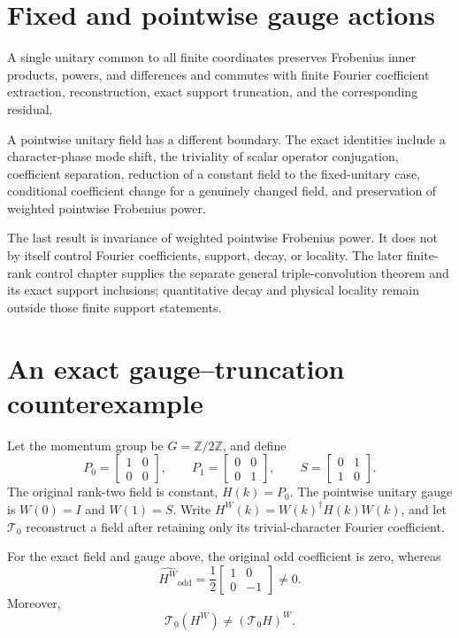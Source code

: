 \section{Fixed and pointwise gauge actions}

A single unitary common to all finite coordinates preserves Frobenius inner products,
powers, and differences and commutes with finite Fourier coefficient extraction,
reconstruction, exact support truncation, and the corresponding residual.

A pointwise unitary field has a different boundary. The exact identities include a
character-phase mode shift, the triviality of scalar operator conjugation, coefficient
separation, reduction of a constant field to the fixed-unitary case, conditional
coefficient change for a genuinely changed field, and preservation of weighted
pointwise Frobenius power.

The last result is invariance of weighted pointwise Frobenius power.  It does not by
itself control Fourier coefficients, support, decay, or locality.  The later finite-rank
control chapter supplies the separate general triple-convolution theorem and its exact
support inclusions; quantitative decay and physical locality remain outside those finite
support statements.

\section{An exact gauge--truncation counterexample}
\label{sec:gauge-truncation-counterexample}

Let the momentum group be $G=\mathbb Z/2\mathbb Z$, and define
\[
  P_0=\begin{bmatrix}1&0\\0&0\end{bmatrix},\qquad
  P_1=\begin{bmatrix}0&0\\0&1\end{bmatrix},\qquad
  S=\begin{bmatrix}0&1\\1&0\end{bmatrix}.
\]
The original rank-two field is constant, $H(k)=P_0$.  The pointwise unitary gauge is
$W(0)=I$ and $W(1)=S$.  Write $H^W(k)=W(k)^\dagger H(k)W(k)$, and let
$\mathcal T_0$ reconstruct a field after retaining only its trivial-character Fourier
coefficient.

\begin{theorem}
\label{thm:two-point-gauge-truncation}
For the exact field and gauge above, the original odd coefficient is zero, whereas
\[
  \widehat{H^W}_{\mathrm{odd}}
  =\frac12\begin{bmatrix}1&0\\0&-1\end{bmatrix}\neq 0.
\]
Moreover,
\[
  \mathcal T_0(H^W)\neq (\mathcal T_0 H)^W.
\]
\end{theorem}

